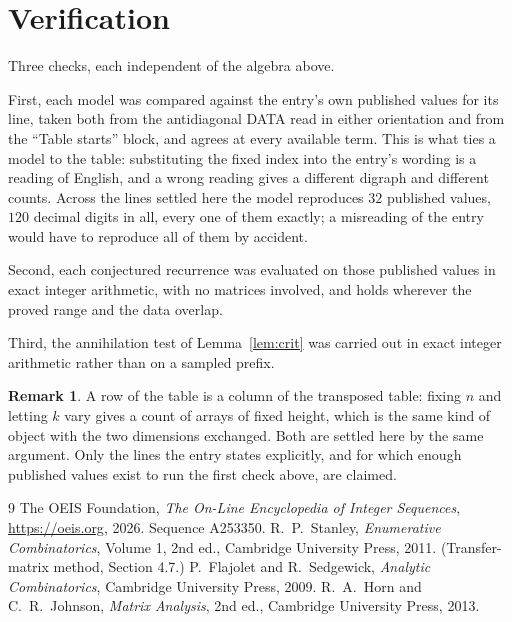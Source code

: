 \documentclass[11pt,a4paper]{article}
\theoremstyle{plain}
\theoremstyle{definition}
\newtheorem{remark}[theorem]{Remark}
\begin{document}
\section{Verification}

Three checks, each independent of the algebra above.

First, each model was compared against the entry's own published values for its line, taken
both from the antidiagonal DATA read in either orientation and from the ``Table starts''
block, and agrees at every available term. This is what ties a model to the table:
substituting the fixed index into the entry's wording is a reading of English, and a wrong
reading gives a different digraph and different counts. Across the lines settled here the
model reproduces $32$ published values, $120$ decimal digits in all, every one of
them exactly; a misreading of the entry would have to reproduce all of them by accident.

Second, each conjectured recurrence was evaluated on those published values in exact
integer arithmetic, with no matrices involved, and holds wherever the proved range and the
data overlap.

Third, the annihilation test of Lemma~\ref{lem:crit} was carried out in exact integer
arithmetic rather than on a sampled prefix.

\begin{remark}
A row of the table is a column of the transposed table: fixing $n$ and letting $k$ vary gives a
count of arrays of fixed height, which is the same kind of object with the two dimensions
exchanged. Both are settled here by the same argument. Only the lines the entry states
explicitly, and for which enough published values exist to run the first check above, are
claimed.
\end{remark}

\begin{thebibliography}{9}
 The OEIS Foundation, \emph{The On-Line Encyclopedia of Integer
Sequences}, \url{https://oeis.org}, 2026. Sequence A253350.
 R.~P.~Stanley, \emph{Enumerative Combinatorics}, Volume 1, 2nd ed.,
Cambridge University Press, 2011. (Transfer-matrix method, Section 4.7.)
 P.~Flajolet and R.~Sedgewick, \emph{Analytic Combinatorics}, Cambridge
University Press, 2009.
 R.~A.~Horn and C.~R.~Johnson, \emph{Matrix Analysis}, 2nd ed., Cambridge
University Press, 2013.
\end{thebibliography}
\end{document}
